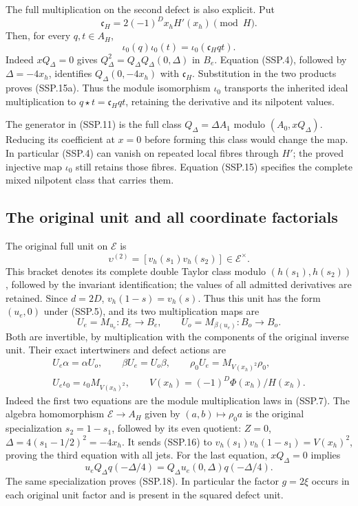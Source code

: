 The full multiplication on the second defect is also explicit.
Put
\[
 \mathfrak c_H=2(-1)^D x_hH'(x_h)\pmod H .
\]
Then, for every \(q,t\in A_H\),
\[
 \iota_0(q)\iota_0(t)=\iota_0(\mathfrak c_Hqt).
 \tag{SSP.15a}
\]
Indeed \(xQ_\Delta=0\) gives
\(Q_\Delta^2=Q_\Delta Q_\Delta(0,\Delta)\) in \(B_e\).
Equation (SSP.4), followed by \(\Delta=-4x_h\), identifies
\(Q_\Delta(0,-4x_h)\) with \(\mathfrak c_H\).
Substitution in the two products proves (SSP.15a).
Thus the module isomorphism \(\iota_0\) transports the
inherited ideal multiplication to \(q\star t=\mathfrak c_Hqt\),
retaining the derivative and its nilpotent values.

The generator in (SSP.11) is the full class \(Q_\Delta=\Delta A_1\)
modulo \((A_0,xQ_\Delta)\).  Reducing its coefficient at \(x=0\)
before forming this class would change the map.  In particular
(SSP.4) can vanish on repeated local fibres through \(H'\);
the proved injective map \(\iota_0\) still retains those fibres.
Equation (SSP.15) specifies the complete mixed nilpotent class
that carries them.

\subsection{The original unit and all coordinate factorials}

The original full unit on \(\mathcal E\) is
\[
 \upsilon^{(2)}=[v_h(s_1)v_h(s_2)]\in\mathcal E^\times .
 \tag{SSP.16}
\]
This bracket denotes its complete double Taylor class modulo
\((h(s_1),h(s_2))\), followed by the invariant identification;
the values of all admitted derivatives are retained.
Since \(d=2D\), \(v_h(1-s)=v_h(s)\).
Thus this unit has the form \((u_e,0)\) under (SSP.5), and
its two multiplication maps are
\[
 U_e=M_{u_e}:B_e\to B_e,\qquad
 U_o=M_{\beta(u_e)}:B_o\to B_o .
 \tag{SSP.17}
\]
Both are invertible, by multiplication with the components of
the original inverse unit.  Their exact intertwiners and defect
actions are
\[
 \begin{gathered}
 U_e\alpha=\alpha U_o,\qquad \beta U_e=U_o\beta,\qquad
 \rho_0U_e=M_{V(x_h)^2}\rho_0,\\
 U_e\iota_0=\iota_0M_{V(x_h)^2},
 \qquad V(x_h)=(-1)^D\Phi(x_h)/H(x_h).
 \end{gathered}                                                    \tag{SSP.18}
\]
Indeed the first two equations are the module multiplication laws
in (SSP.7).  The algebra homomorphism \(\mathcal E\to A_H\)
given by \((a,b)\mapsto\rho_0a\) is the original specialization
\(s_2=1-s_1\), followed by its even quotient:
\(Z=0\), \(\Delta=4(s_1-1/2)^2=-4x_h\).
It sends (SSP.16) to
\(v_h(s_1)v_h(1-s_1)=V(x_h)^2\), proving the third
equation with all jets.  For the last equation,
\(xQ_\Delta=0\) implies
\[
 u_eQ_\Delta q(-\Delta/4)
   =Q_\Delta u_e(0,\Delta)q(-\Delta/4).
 \tag{SSP.19}
\]
The same specialization proves (SSP.18).
In particular the factor \(g=2\xi\) occurs in each original
unit factor and is present in the squared defect unit.

